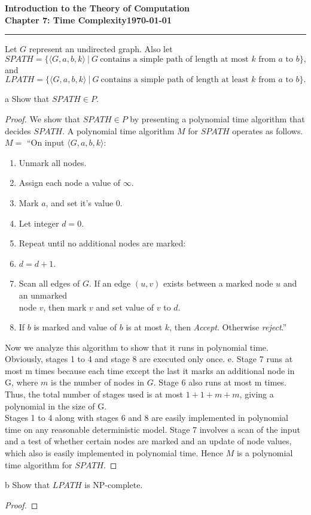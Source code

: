 \documentclass[11pt]{article}
\newcommand{\dated}{\today}
\begin{document}
\textbf{Introduction to the Theory of
Computation}\hfill\textbf{\myname}\\[0.01in]
\textbf{Chapter 7: Time Complexity}\hfill\textbf{\dated}\\
\smallskip\hrule\bigskip

\begin{problem}{7.21}
Let $G$ represent an undirected graph. Also let
\[
SPATH = \{\langle G, a, b, k \rangle \ | \ G \ \text{contains a simple path of length at most } k \text{ from } a \text{ to } b\},
\]
and
\[
LPATH = \{\langle G, a, b, k \rangle \ | \ G \ \text{contains a simple path of length at least } k \text{ from } a \text{ to } b\}.
\]
\end{problem}

\begin{problem}[Part]{a}
Show that $SPATH \in P$.
\end{problem}

\begin{proof}
We show that $SPATH \in P$ by presenting a polynomial time algorithm that decides $SPATH$. A polynomial time algorithm $M$ for $SPATH$ operates as follows. \\

$M =$ \textquotedblleft On input $\langle G, a, b, k \rangle$:
\begin{enumerate}
\item Unmark all nodes.
\item Assign each node a value of $\infty$.
\item Mark $a$, and set it's value 0.
\item Let integer $d = 0$.
\item Repeat until no additional nodes are marked:
\item \hspace*{0.5cm} $d = d + 1$.
\item \hspace*{0.5cm} Scan all edges of $G$. If an edge $(u, v)$ exists between a marked node $u$ and an unmarked \\
 \hspace*{0.5cm} node $v$, then mark $v$ and set value of $v$ to $d$.
\item If $b$ is marked and value of $b$ is at most $k$, then \textit{Accept}. Otherwise \textit{reject}.\textquotedblright
\end{enumerate}
Now we analyze this algorithm to show that it runs in polynomial time. Obviously, stages 1 to 4 and stage 8 are executed only once. e. Stage 7 runs at most m times because each time except the last it marks an additional node in G, where $m$ is the number of nodes in $G$. Stage 6 also runs at most m times. Thus, the total number of stages used is at most $1 + 1 + m + m$, giving a polynomial in the size of G. \\

Stages 1 to 4 along with stages 6 and 8 are easily implemented in polynomial time on any reasonable deterministic model. Stage 7 involves a scan of the input and a test of
whether certain nodes are marked and an update of node values, which also is easily implemented in polynomial time. Hence $M$ is a polynomial time algorithm for $SPATH$.
\end{proof}

\begin{problem}[Part]{b}
Show that $LPATH$ is NP-complete.
\end{problem}

\begin{proof}
\end{proof}
\end{document}
